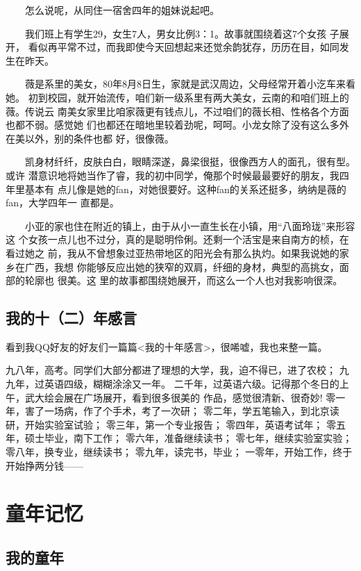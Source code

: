 \documentclass[12pt]{book}
\begin{document}
　　怎么说呢，从同住一宿舍四年的姐妹说起吧。

　　我们班上有学生29，女生7人，男女比例3：1。故事就围绕着这7个女孩 子展开，
看似再平常不过，而我即使今天回想起来还觉余韵犹存，历历在目，如同发生在昨天。

　　薇是系里的美女，80年8月8日生，家就是武汉周边，父母经常开着小汔车来看她。
初到校园，就开始流传，咱们新一级系里有两大美女，云南的和咱们班上的薇。传说云
南美女家里比咱家薇更有钱点儿，不过咱们的薇长相、性格各个方面也都不弱。感觉她
们也都还在暗地里较着劲呢，呵呵。小龙女除了没有这么多外在美以外，别的条件也都
好，很像薇。

　　凯身材纤纤，皮肤白白，眼睛深遂，鼻梁很挺，很像西方人的面孔，很有型。或许
潜意识地将她当作了睿，我的初中同学，俺那个时候最最要好的朋友，我四年里基本有
点儿像是她的fan，对她很要好。这种fan的关系还挺多，纳纳是薇的fan，大学四年一
直都是。

　　小亚的家也住在附近的镇上，由于从小一直生长在小镇，用“八面玲珑”来形容这
个女孩一点儿也不过分，真的是聪明伶俐。还剩一个活宝是来自南方的桢，在看过她之
前，我从不曾想象过亚热带地区的阳光会有那么执灼。如果我说她的家乡在广西，我想
你能够反应出她的狭窄的双肩，纤细的身材，典型的高挑女，面部的轮廓也 很美。这
里的故事都围绕她展开，而这么一个人也对我影响很深。
\section{我的十（二）年感言}
\label{sec-1-5}

看到我QQ好友的好友们一篇篇<我的十年感言>，很唏嘘，我也来整一篇。

九八年，高考。同学们大部分都进了理想的大学，我，迫不得已，进了农校；
九九年，过英语四级，糊糊涂涂又一年。
二千年，过英语六级。记得那个冬日的上午，武大绘会展在广场展开，看到很多很美的
作品，感觉很清新、很奇妙!
零一年，害了一场病，作了个手术，考了一次研；
零二年，学五笔输入，到北京读研，开始实验室试验；
零三年，第一个专业报告；
零四年，英语考试年；
零五年，硕士毕业，南下工作；
零六年，准备继续读书；
零七年，继续实验室实验；
零八年，换专业，继续读书；
零九年，读完书，毕业；
一零年，开始工作，终于开始挣两分钱------

\chapter{童年记忆}
\label{sec-2}
\section{我的童年}
\label{sec-2-1}
\end{document}
